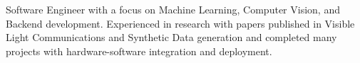 Software Engineer with a focus on Machine Learning, Computer Vision, and Backend development. Experienced in research with papers published in Visible Light Communications and  Synthetic Data generation and completed many projects with hardware-software integration and deployment. 